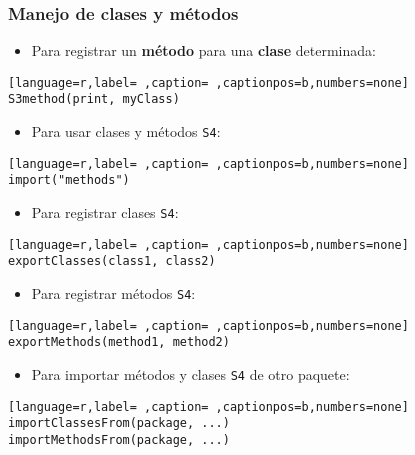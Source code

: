 \subsubsection{Manejo de clases y métodos}
\label{sec:org575aab4}
\begin{itemize}
\item Para registrar un \textbf{método} para una \textbf{clase} determinada:
\end{itemize}
\begin{lstlisting}[language=r,label= ,caption= ,captionpos=b,numbers=none]
S3method(print, myClass)
\end{lstlisting}
\begin{itemize}
\item Para usar clases y métodos \texttt{S4}:
\end{itemize}
\begin{lstlisting}[language=r,label= ,caption= ,captionpos=b,numbers=none]
import("methods")
\end{lstlisting}
\begin{itemize}
\item Para registrar clases \texttt{S4}:
\end{itemize}
\begin{lstlisting}[language=r,label= ,caption= ,captionpos=b,numbers=none]
exportClasses(class1, class2)
\end{lstlisting}
\begin{itemize}
\item Para registrar métodos \texttt{S4}:
\end{itemize}
\begin{lstlisting}[language=r,label= ,caption= ,captionpos=b,numbers=none]
exportMethods(method1, method2)
\end{lstlisting}
\begin{itemize}
\item Para importar métodos y clases \texttt{S4} de otro paquete:
\end{itemize}
\begin{lstlisting}[language=r,label= ,caption= ,captionpos=b,numbers=none]
importClassesFrom(package, ...)
importMethodsFrom(package, ...)
\end{lstlisting}
